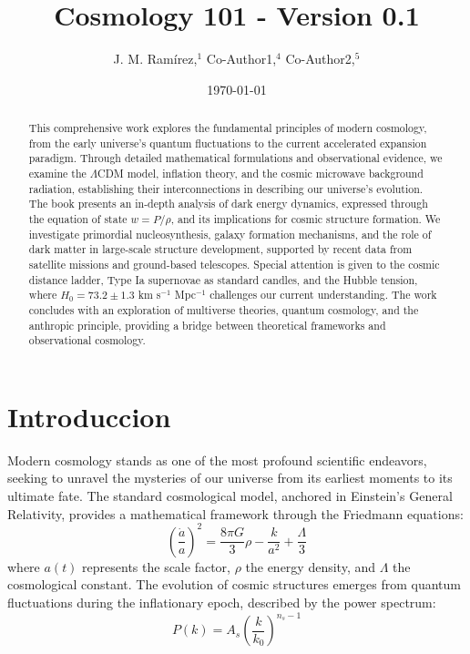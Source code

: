 \documentclass{article}\usepackage{graphicx} \usepackage{amsmath} \usepackage{colortbl}\title{Cosmology 101 - Version 0.1}
\author{J. M. Ram{\'i}rez,$^{1}$ Co-Author1,$^{4}$ Co-Author2,$^{5}$}
\date{\today}
\begin{document}
\maketitle\begin{abstract} 
This comprehensive work explores the fundamental principles of modern cosmology, from the early universe's quantum fluctuations to the current accelerated expansion paradigm. Through detailed mathematical formulations and observational evidence, we examine the $\Lambda$CDM model, inflation theory, and the cosmic microwave background radiation, establishing their interconnections in describing our universe's evolution. The book presents an in-depth analysis of dark energy dynamics, expressed through the equation of state $w = P/\rho$, and its implications for cosmic structure formation. We investigate primordial nucleosynthesis, galaxy formation mechanisms, and the role of dark matter in large-scale structure development, supported by recent data from satellite missions and ground-based telescopes. Special attention is given to the cosmic distance ladder, Type Ia supernovae as standard candles, and the Hubble tension, where $H_0 = 73.2 \pm 1.3$ km s$^{-1}$ Mpc$^{-1}$ challenges our current understanding. The work concludes with an exploration of multiverse theories, quantum cosmology, and the anthropic principle, providing a bridge between theoretical frameworks and observational cosmology. \end{abstract}\section{Introduccion}
Modern cosmology stands as one of the most profound scientific endeavors, seeking to unravel the mysteries of our universe from its earliest moments to its ultimate fate. The standard cosmological model, anchored in Einstein's General Relativity, provides a mathematical framework through the Friedmann equations:  
\begin{equation} \left(\frac{\dot{a}}{a}\right)^2 = \frac{8\pi G}{3}\rho - \frac{k}{a^2} + \frac{\Lambda}{3}
\end{equation}  
where $a(t)$ represents the scale factor, $\rho$ the energy density, and $\Lambda$ the cosmological constant. The evolution of cosmic structures emerges from quantum fluctuations during the inflationary epoch, described by the power spectrum:  
\begin{equation} P(k) = A_s\left(\frac{k}{k_0}\right)^{n_s-1} 
\end{equation}  
\end{document}
